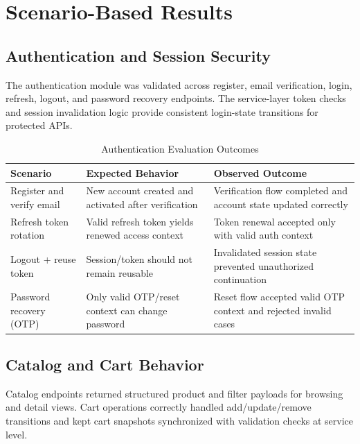 \section{Scenario-Based Results}

\subsection{Authentication and Session Security}

The authentication module was validated across register, email verification, login, refresh, logout, and password recovery endpoints. The service-layer token checks and session invalidation logic provide consistent login-state transitions for protected APIs.

\begin{table}[H]
\centering
\caption{Authentication Evaluation Outcomes}
\label{tab:discussion-auth-outcomes}
\begin{tabular}{|p{3.4cm}|p{4.2cm}|p{4.4cm}|}
\hline
\textbf{Scenario} & \textbf{Expected Behavior} & \textbf{Observed Outcome} \\
\hline
Register and verify email & New account created and activated after verification & Verification flow completed and account state updated correctly \\
\hline
Refresh token rotation & Valid refresh token yields renewed access context & Token renewal accepted only with valid auth context \\
\hline
Logout + reuse token & Session/token should not remain reusable & Invalidated session state prevented unauthorized continuation \\
\hline
Password recovery (OTP) & Only valid OTP/reset context can change password & Reset flow accepted valid OTP context and rejected invalid cases \\
\hline
\end{tabular}
\end{table}

\subsection{Catalog and Cart Behavior}

Catalog endpoints returned structured product and filter payloads for browsing and detail views. Cart operations correctly handled add/update/remove transitions and kept cart snapshots synchronized with validation checks at service level.

